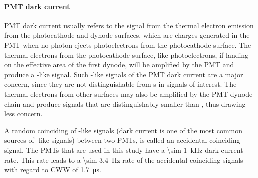 \paragraph{PMT dark current}
\label{sec:events dark current}
PMT dark current usually refers to the signal from the thermal electron emission from the photocathode and dynode surfaces, which are charges generated in the PMT when no photon ejects photoelectrons from the photocathode surface. The thermal electrons from the photocathode surface, like photoelectrons, if landing on the effective area of the first dynode, will be amplified by the PMT and produce a \sphe -like signal. Such \sphe -like signals of the PMT dark current are a major concern, since they are not distinguishable from \sphe s in signals of interest. The thermal electrons from other surfaces may also be amplified by the PMT dynode chain and produce signals that are distinguishably smaller than \sphe , thus drawing less concern. 

A random coinciding of \sphe -like signals (dark current is one of the most common sources of \sphe -like signals) between two PMTs, is called an accidental coinciding signal. The PMTs that are used in this study have a \SI{\sim 1}{\kHz} dark current rate.  This rate leads to a \SI{\sim 3.4}{\Hz} rate of the accidental coinciding signals with regard to CWW of \SI{1.7}{\us}. 
 
